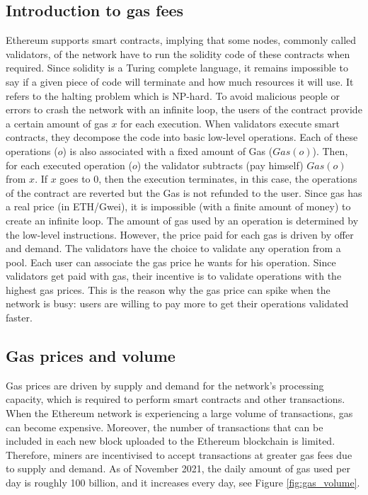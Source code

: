 \subsection{Introduction to gas fees}
Ethereum\cite{EthereumWhitepaper}  supports smart contracts, implying that some nodes, commonly called validators, of the network have to run the solidity code of these contracts when required. Since solidity is a  Turing complete language,  it remains impossible to say if a given piece of code will terminate and how much resources it will use. It refers to the halting problem which is NP-hard\cite{soler_introduction_2012}. To avoid malicious people or errors to crash the network with an infinite loop, the users of the contract provide a certain amount of gas $x$ for each execution.  When validators execute smart contracts, they decompose the code into basic low-level operations. Each of these operations ($o$) is also associated with a fixed amount of Gas ($Gas(o)$). Then, for each executed operation ($o$) the validator subtracts (pay himself) $Gas(o)$ from $x$.  If  $x$  goes to  $0$, then the execution terminates,  in this case,  the operations of the contract are reverted but the Gas is not refunded to the user. Since gas has a real price (in ETH/Gwei), it is impossible (with a finite amount of money) to create an infinite loop. The amount of gas used by an operation is determined by the low-level instructions. However, the price paid for each gas is driven by offer and demand. The validators have the choice to validate any operation from a  pool.  Each user can associate the gas price he wants for his operation. Since validators get paid with gas, their incentive is to validate operations with the highest gas prices. This is the reason why the gas price can spike when the network is busy: users are willing to pay more to get their operations validated faster.
\subsection{Gas prices and volume}
Gas prices are driven by supply and demand for the network's processing capacity, which is required to perform smart contracts and other transactions.
When the Ethereum network is experiencing a large volume of transactions, gas can become expensive. Moreover, the number of transactions that can be included in each new block uploaded to the Ethereum blockchain is limited. Therefore, miners are incentivised to accept transactions at greater gas fees due to supply and demand. As of November 2021, the daily amount of gas used per day is roughly 100 billion, and it increases every day, see Figure \ref{fig:gas_volume}. 

